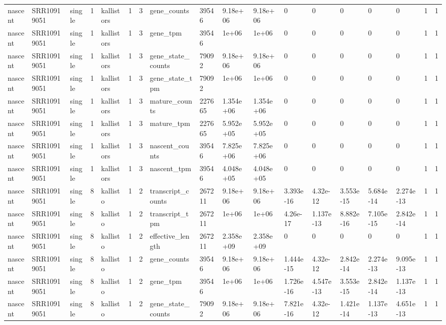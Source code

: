 \begin{tabular}{llllllllllllllllll}
nascent & SRR10919051 & single & 1 & kallistors & 1 & 3 & gene\_counts & 39546 & 9.18e+06 & 9.18e+06 & 0 & 0 & 0 & 0 & 0 & 1 & 1 \\
nascent & SRR10919051 & single & 1 & kallistors & 1 & 3 & gene\_tpm & 39546 & 1e+06 & 1e+06 & 0 & 0 & 0 & 0 & 0 & 1 & 1 \\
nascent & SRR10919051 & single & 1 & kallistors & 1 & 3 & gene\_state\_counts & 79092 & 9.18e+06 & 9.18e+06 & 0 & 0 & 0 & 0 & 0 & 1 & 1 \\
nascent & SRR10919051 & single & 1 & kallistors & 1 & 3 & gene\_state\_tpm & 79092 & 1e+06 & 1e+06 & 0 & 0 & 0 & 0 & 0 & 1 & 1 \\
nascent & SRR10919051 & single & 1 & kallistors & 1 & 3 & mature\_counts & 227665 & 1.354e+06 & 1.354e+06 & 0 & 0 & 0 & 0 & 0 & 1 & 1 \\
nascent & SRR10919051 & single & 1 & kallistors & 1 & 3 & mature\_tpm & 227665 & 5.952e+05 & 5.952e+05 & 0 & 0 & 0 & 0 & 0 & 1 & 1 \\
nascent & SRR10919051 & single & 1 & kallistors & 1 & 3 & nascent\_counts & 39546 & 7.825e+06 & 7.825e+06 & 0 & 0 & 0 & 0 & 0 & 1 & 1 \\
nascent & SRR10919051 & single & 1 & kallistors & 1 & 3 & nascent\_tpm & 39546 & 4.048e+05 & 4.048e+05 & 0 & 0 & 0 & 0 & 0 & 1 & 1 \\
nascent & SRR10919051 & single & 8 & kallisto & 1 & 2 & transcript\_counts & 267211 & 9.18e+06 & 9.18e+06 & 3.393e-16 & 4.32e-12 & 3.553e-15 & 5.684e-14 & 2.274e-13 & 1 & 1 \\
nascent & SRR10919051 & single & 8 & kallisto & 1 & 2 & transcript\_tpm & 267211 & 1e+06 & 1e+06 & 4.26e-17 & 1.137e-13 & 8.882e-16 & 7.105e-15 & 2.842e-14 & 1 & 1 \\
nascent & SRR10919051 & single & 8 & kallisto & 1 & 2 & effective\_length & 267211 & 2.358e+09 & 2.358e+09 & 0 & 0 & 0 & 0 & 0 & 1 & 1 \\
nascent & SRR10919051 & single & 8 & kallisto & 1 & 2 & gene\_counts & 39546 & 9.18e+06 & 9.18e+06 & 1.444e-15 & 4.32e-12 & 2.842e-14 & 2.274e-13 & 9.095e-13 & 1 & 1 \\
nascent & SRR10919051 & single & 8 & kallisto & 1 & 2 & gene\_tpm & 39546 & 1e+06 & 1e+06 & 1.726e-16 & 4.547e-13 & 3.553e-15 & 2.842e-14 & 1.137e-13 & 1 & 1 \\
nascent & SRR10919051 & single & 8 & kallisto & 1 & 2 & gene\_state\_counts & 79092 & 9.18e+06 & 9.18e+06 & 7.821e-16 & 4.32e-12 & 1.421e-14 & 1.137e-13 & 4.651e-13 & 1 & 1 \\

\end{tabular}
